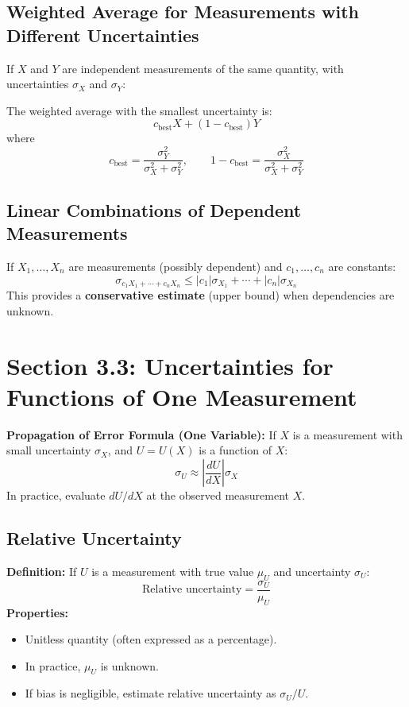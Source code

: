 \documentclass[11pt]{article}
\begin{document}
\subsection*{Weighted Average for Measurements with Different Uncertainties}
If \(X\) and \(Y\) are independent measurements of the same quantity, with uncertainties \(\sigma_X\) and \(\sigma_Y\):

The weighted average with the smallest uncertainty is:
\[
c_{\text{best}}X + (1 - c_{\text{best}})Y
\]
where
\[
c_{\text{best}} = \frac{\sigma_Y^2}{\sigma_X^2 + \sigma_Y^2},\qquad 1 - c_{\text{best}} = \frac{\sigma_X^2}{\sigma_X^2 + \sigma_Y^2}
\]

\subsection*{Linear Combinations of Dependent Measurements}
If \(X_1, \ldots, X_n\) are measurements (possibly dependent) and \(c_1, \ldots, c_n\) are constants:
\[
\sigma_{c_1X_1 + \cdots + c_nX_n} \leq |c_1|\sigma_{X_1} + \cdots + |c_n|\sigma_{X_n}
\]
This provides a \textbf{conservative estimate} (upper bound) when dependencies are unknown.

\section*{Section 3.3: Uncertainties for Functions of One Measurement}
\textbf{Propagation of Error Formula (One Variable):}
If \(X\) is a measurement with small uncertainty \(\sigma_X\), and \(U = U(X)\) is a function of \(X\):
\[
\sigma_U \approx \left| \frac{dU}{dX} \right| \sigma_X
\]
In practice, evaluate \(dU/dX\) at the observed measurement \(X\).

\subsection*{Relative Uncertainty}
\textbf{Definition:} If \(U\) is a measurement with true value \(\mu_U\) and uncertainty \(\sigma_U\):
\[
\text{Relative uncertainty} = \frac{\sigma_U}{\mu_U}
\]
\textbf{Properties:}
\begin{itemize}[nosep]
    \item Unitless quantity (often expressed as a percentage).
    \item In practice, \(\mu_U\) is unknown.
    \item If bias is negligible, estimate relative uncertainty as \(\sigma_U / U\).
\end{itemize}
\end{document}
